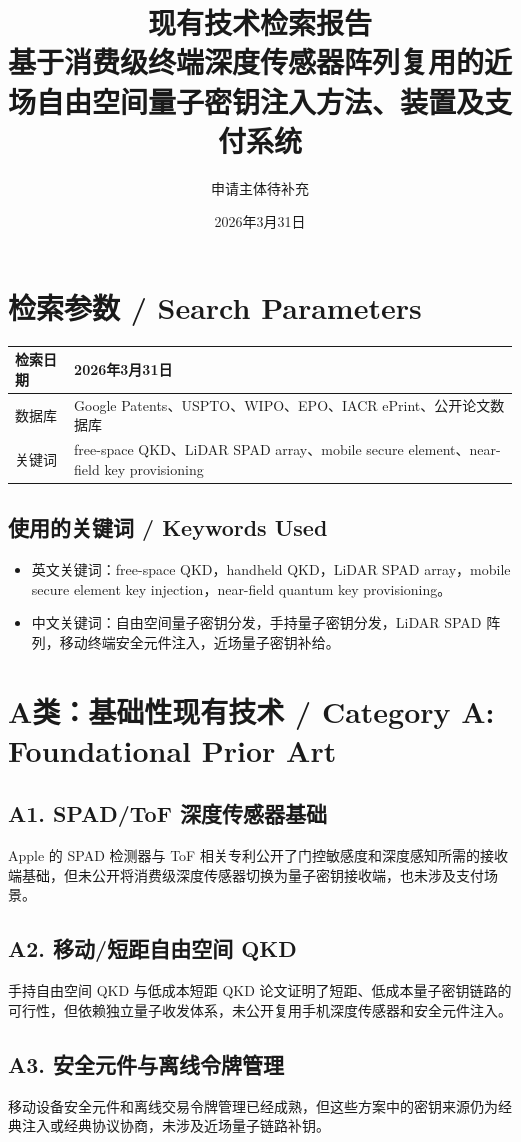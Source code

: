 ﻿\documentclass[12pt,a4paper]{article}
\title{\textbf{现有技术检索报告}\\[0.5em]\Large 基于消费级终端深度传感器阵列复用的近场自由空间量子密钥注入方法、装置及支付系统}
\author{申请主体待补充}
\date{2026年3月31日}
\begin{document}
\maketitle
\tableofcontents
\newpage
\section{检索参数 / Search Parameters}
\begin{tabular}{|p{4cm}|p{9cm}|}
\hline
检索日期 & 2026年3月31日 \\
\hline
数据库 & Google Patents、USPTO、WIPO、EPO、IACR ePrint、公开论文数据库 \\
\hline
关键词 & free-space QKD、LiDAR SPAD array、mobile secure element、near-field key provisioning \\
\hline
\end{tabular}

\subsection{使用的关键词 / Keywords Used}
\begin{itemize}
\item 英文关键词：free-space QKD，handheld QKD，LiDAR SPAD array，mobile secure element key injection，near-field quantum key provisioning。
\item 中文关键词：自由空间量子密钥分发，手持量子密钥分发，LiDAR SPAD 阵列，移动终端安全元件注入，近场量子密钥补给。
\end{itemize}

\section{A类：基础性现有技术 / Category A: Foundational Prior Art}
\subsection{A1. SPAD/ToF 深度传感器基础}
Apple 的 SPAD 检测器与 ToF 相关专利公开了门控敏感度和深度感知所需的接收端基础，但未公开将消费级深度传感器切换为量子密钥接收端，也未涉及支付场景。

\subsection{A2. 移动/短距自由空间 QKD}
手持自由空间 QKD 与低成本短距 QKD 论文证明了短距、低成本量子密钥链路的可行性，但依赖独立量子收发体系，未公开复用手机深度传感器和安全元件注入。

\subsection{A3. 安全元件与离线令牌管理}
移动设备安全元件和离线交易令牌管理已经成熟，但这些方案中的密钥来源仍为经典注入或经典协议协商，未涉及近场量子链路补钥。
\end{document}
